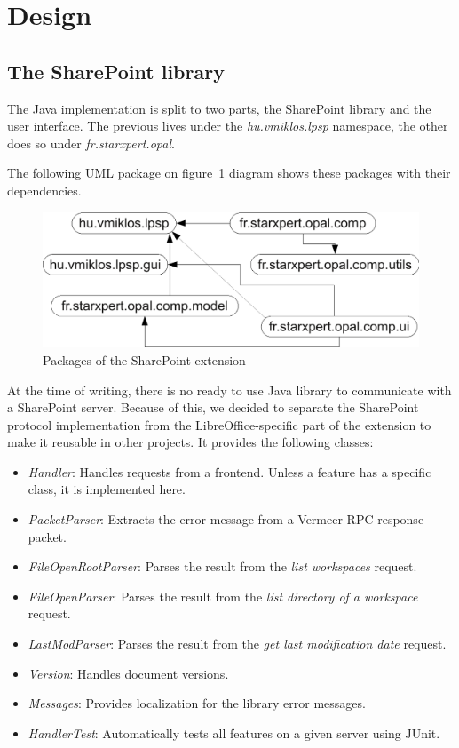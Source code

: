 \section{Design}

\subsection{The SharePoint library}

The Java implementation is split to two parts, the SharePoint library and the
user interface. The previous lives under the \emph{hu.vmiklos.lpsp} namespace,
the other does so under \emph{fr.starxpert.opal}.

The following UML package on figure~\ref{fig:design-packages} diagram shows
these packages with their dependencies.

\begin{figure}[H]
\centering
\includegraphics[width=425px,keepaspectratio]{design-packages.pdf}
\caption{Packages of the SharePoint extension}
\label{fig:design-packages}
\end{figure}

At the time of writing, there is no ready to use Java library to communicate
with a SharePoint server. Because of this, we decided to separate the SharePoint
protocol implementation from the LibreOffice-specific part of the extension to
make it reusable in other projects. It provides the following classes:

\begin{itemize}
\item \emph{Handler}: Handles requests from a frontend. Unless a feature has a
specific class, it is implemented here.
\item \emph{PacketParser}: Extracts the error message from a Vermeer
RPC\cite{vermeer} response packet.
\item \emph{FileOpenRootParser}: Parses the result from the \emph{list
workspaces} request.
\item \emph{FileOpenParser}: Parses the result from the \emph{list directory of
a workspace} request.
\item \emph{LastModParser}: Parses the result from the \emph{get last
modification date} request.
\item \emph{Version}: Handles document versions.
\item \emph{Messages}: Provides localization for the library error messages.
\item \emph{HandlerTest}: Automatically tests all features on a given server
using JUnit.
\end{itemize}


